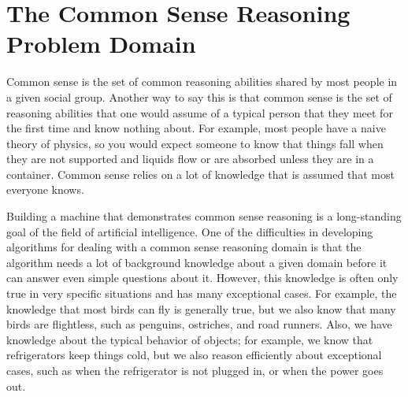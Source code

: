 \section{The Common Sense Reasoning Problem Domain}

Common sense is the set of common reasoning abilities shared by most
people in a given social group.  Another way to say this is that
common sense is the set of reasoning abilities that one would assume
of a typical person that they meet for the first time and know nothing
about.  For example, most people have a naive theory of physics, so
you would expect someone to know that things fall when they are not
supported and liquids flow or are absorbed unless they are in a
container.  Common sense relies on a lot of knowledge that is assumed
that most everyone knows.








Building a machine that demonstrates common sense reasoning is a
long-standing goal of the field of artificial intelligence.  One of
the difficulties in developing algorithms for dealing with a common
sense reasoning domain is that the algorithm needs a lot of background
knowledge about a given domain before it can answer even simple
questions about it.  However, this knowledge is often only true in
very specific situations and has many exceptional cases.  For example,
the knowledge that most birds can fly is generally true, but we also
know that many birds are flightless, such as penguins, ostriches, and
road runners.  Also, we have knowledge about the typical behavior of
objects; for example, we know that refrigerators keep things cold,
but we also reason efficiently about exceptional cases, such as when
the refrigerator is not plugged in, or when the power goes out.

